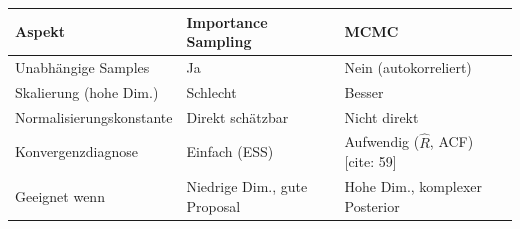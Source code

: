 
\begin{table}[h]
    \centering\small
    \begin{tabular}{lll}
        \toprule
        \textbf{Aspekt} & \textbf{Importance Sampling} & \textbf{MCMC} \\
        \midrule
        Unabhängige Samples & Ja & Nein (autokorreliert) \\
        Skalierung (hohe Dim.) & Schlecht & Besser \\
        Normalisierungskonstante & Direkt schätzbar & Nicht direkt \\
        Konvergenzdiagnose & Einfach (ESS) & Aufwendig ($\hat{R}$, ACF) [cite: 59] \\
        Geeignet wenn & Niedrige Dim., gute Proposal & Hohe Dim., komplexer Posterior \\
        \bottomrule
    \end{tabular}
\end{table}